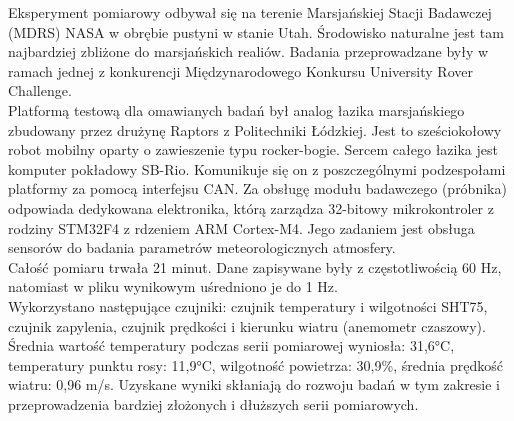 \documentclass[\main/boa.tex]{subfiles}
\begin{document}
Eksperyment pomiarowy odbywał się na terenie Marsjańskiej Stacji Badawczej (MDRS) NASA w obrębie pustyni w stanie Utah. Środowisko naturalne jest tam najbardziej zbliżone do marsjańskich realiów. Badania przeprowadzane były w ramach jednej z konkurencji Międzynarodowego Konkursu University Rover Challenge. \\
Platformą testową dla omawianych badań był analog łazika marsjańskiego zbudowany przez drużynę Raptors z Politechniki Łódzkiej. Jest to sześciokołowy robot mobilny oparty o zawieszenie typu rocker-bogie. Sercem całego łazika jest komputer pokładowy SB-Rio. Komunikuje się on z poszczególnymi podzespołami platformy za pomocą interfejsu CAN. Za obsługę modułu badawczego (próbnika) odpowiada dedykowana elektronika, którą zarządza 32-bitowy mikrokontroler z rodziny STM32F4 z rdzeniem ARM Cortex-M4. Jego zadaniem jest obsługa sensorów do badania parametrów meteorologicznych atmosfery.\\
Całość pomiaru trwała 21 minut. Dane zapisywane były z częstotliwością 60 Hz, natomiast w pliku wynikowym uśredniono je do 1 Hz. \\
Wykorzystano następujące czujniki: czujnik temperatury i wilgotności SHT75, czujnik zapylenia, czujnik prędkości i kierunku wiatru (anemometr czaszowy). \\
Średnia wartość temperatury podczas serii pomiarowej wyniosła: 31,6°C, temperatury punktu rosy: 11,9°C, wilgotność powietrza: 30,9\%, średnia prędkość wiatru: 0,96 m/s. 
Uzyskane wyniki skłaniają do rozwoju badań w tym zakresie i przeprowadzenia bardziej złożonych i dłuższych serii pomiarowych. 
\end{document}
